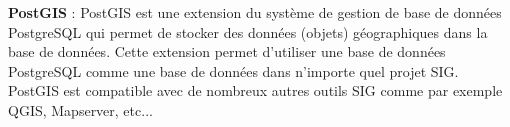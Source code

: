 \textbf{PostGIS} : PostGIS est une extension du système de gestion de base de données PostgreSQL qui permet de stocker des données (objets) géographiques dans la base de données. Cette extension permet d'utiliser une base de données PostgreSQL comme une base de données dans n'importe quel projet SIG. PostGIS est compatible avec de nombreux autres outils SIG comme par exemple QGIS, Mapserver, etc...\\